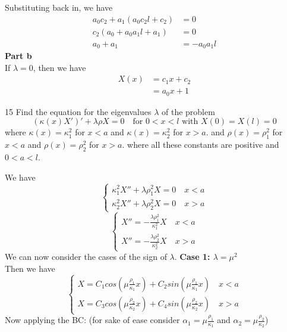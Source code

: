 \documentclass[answers,12pt,addpoints]{exam}
\begin{document}
\begin{questions}
\begin{solution}
        Substituting back in, we have
        \begin{align*}
            a_0c_2 + a_1(a_0c_2 l + c_2) &= 0 \\
            c_2(a_0 + a_0a_1l + a_1) &= 0\\
            a_0 + a_1 &= -a_0a_1l 
        \end{align*}
        \textbf{Part b} \\
        If $\lambda = 0$, then we have
        \begin{align*}
            X(x) &= c_1x + c_2\\
            &= a_0x +1
        \end{align*}

    \end{solution}

     15
    Find the equation for the eigenvalues $\lambda$ of the problem
    \[ (\kappa(x) X' )' + \lambda \rho X = 0 \quad \text{for } 0 < x < l \text{ with } X(0) = X(l) = 0 \]
    where $\kappa(x) = \kappa_1^2$ for $x<a$ and $\kappa(x) = \kappa_2^2$ for $x>a$. and $\rho(x) = \rho_1^2$ for $x<a$ and $\rho(x) = \rho_2^2$ for $x>a$. where all these constants are positive and $0 < a < l$.
    \begin{solution}
        We have 
        $$\begin{cases}
            \kappa_1^2 X'' +\lambda \rho_1^2 X = 0 \quad x < a \\
            \kappa_2^2 X'' +\lambda \rho_2^2 X = 0 \quad x > a
        \end{cases}$$
        $$\begin{cases}
            X'' = -\frac{\lambda \rho_1^2}{\kappa_1^2} X  \quad x < a \\
            X'' = -\frac{\lambda \rho_2^2}{\kappa_2^2} X \quad x > a
        \end{cases}$$
        We can now consider the cases of the sign of $\lambda$.
        \textbf{Case 1: $\lambda = \mu^2$} \\
        Then we have
        $$\begin{cases}
            X = C_1 cos(\mu\frac{\rho_1}{\kappa_1}x) + C_2 sin(\mu\frac{\rho_1}{\kappa_1}x) \quad x < a \\
            X = C_3 cos(\mu\frac{\rho_2}{\kappa_2}x) + C_4 sin(\mu\frac{\rho_2}{\kappa_2}x) \quad x > a
        \end{cases}$$
        Now applying the BC: (for sake of ease consider $\alpha_1 = \mu\frac{\rho_1}{\kappa_1}$ and $\alpha_2 = \mu\frac{\rho_2}{\kappa_2}$)

\end{solution}
\end{questions}
\end{document}
